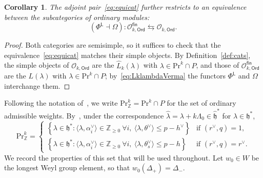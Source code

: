 \documentclass[12pt,a4paper,reqno]{amsart}
\numberwithin{equation}{section}
\newtheorem{corollary}[theorem]{Corollary}
\theoremstyle{definition}
\newcommand{\Z}{\mathbb{Z}}
\def\O{\mathcal{O}}
\def\Ord{\mathsf{Ord}}
\def\fin{\mathsf{fin}}
\def\L{\mathsf{L}}
\def\Om{\Omega}
\def\Pr{\mathrm{Pr}}
\def\la{\lambda}
\def \al{\alpha}
\def \h{\mathfrak{h}}
\def\<{\langle}
\def\>{\rangle}
\begin{document}
\begin{corollary}\label{coro:equiofcats}
The adjoint pair~\eqref{eq:equicat} further restricts to an equivalence between the subcategories of ordinary modules:
\[(\Phi^\L\dashv \Om):\O_{k,\Ord}^\fin\leftrightarrows \O_{k,\Ord}.\]
\end{corollary}
\begin{proof}
Both categories are semisimple, so it suffices to check that the equivalence~\eqref{eq:equicat} matches their simple objects. By Definition~\ref{def:cats}, the simple objects of $\O_{k,\Ord}$ are the $\hat{L}_k(\la)$ with $\la\in \Pr^k\cap P$, and those of $\O^\fin_{k,\Ord}$ are the $L(\la)$ with $\la\in \Pr^k\cap P$; by~\eqref{eq:LklambdaVerma} the functors $\Phi^\L$ and $\Om$ interchange them.
\end{proof}

Following the notation of~\cite{A16,AvEM22}, we write $\Pr^k_\Z=\Pr^k\cap P$ for the set of ordinary admissible weights. By~\cite[eq.~(10)]{A16}, under the correspondence $\hat{\la}=\la+k\Lambda_0\in \hat{\h}^\ast$ for $\la\in \h^\ast$,
\begin{equation}\label{eq:PrkZ}
\Pr^k_\Z=\begin{cases}
\left\{\la\in \h^\ast: \<\la,\al^\vee_i\>\in \Z_{\geq 0}\ \forall i,\ \<\la,\theta^\vee\>\leq p-h^\vee \right\}& \text{if }(r^\vee,q)=1,\\
\left\{\la\in\h^\ast: \<\la,\al^\vee_i\>\in \Z_{\geq 0}\ \forall i,\ \<\la,\theta_s^\vee\>\leq p-h \right\}& \text{if }(r^\vee,q)=r^\vee.
\end{cases}
\end{equation}
We record the properties of this set that will be used throughout. Let $w_0\in W$ be the longest Weyl group element, so that $w_0(\Delta_+)=\Delta_-$.
\end{document}
